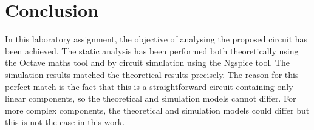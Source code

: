 \section{Conclusion}
\label{sec:conclusion}

In this laboratory assignment, the objective of analysing the proposed circuit has been
achieved. The static analysis has been performed both theoretically using the Octave maths 
tool and by circuit simulation using the Ngspice tool. The simulation results matched the theoretical results
precisely. The reason for this perfect match is the fact that this is a
straightforward circuit containing only linear components, so the theoretical
and simulation models cannot differ. For more complex components, the
theoretical and simulation models could differ but this is not the case in this
work.

\lipsum[1-1]
